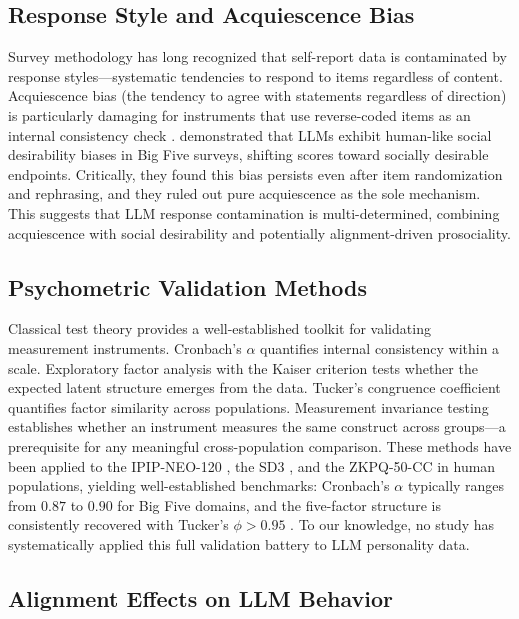 \documentclass[11pt]{article}
\begin{document}
\subsection{Response Style and Acquiescence Bias}

Survey methodology has long recognized that self-report data is contaminated by response styles---systematic tendencies to respond to items regardless of content. Acquiescence bias (the tendency to agree with statements regardless of direction) is particularly damaging for instruments that use reverse-coded items as an internal consistency check \citep{lord1968statistical}. \citet{acerbi2024llm} demonstrated that LLMs exhibit human-like social desirability biases in Big Five surveys, shifting scores toward socially desirable endpoints. Critically, they found this bias persists even after item randomization and rephrasing, and they ruled out pure acquiescence as the sole mechanism. This suggests that LLM response contamination is multi-determined, combining acquiescence with social desirability and potentially alignment-driven prosociality.

\subsection{Psychometric Validation Methods}

Classical test theory provides a well-established toolkit for validating measurement instruments. Cronbach's $\alpha$ \citep{cronbach1951coefficient} quantifies internal consistency within a scale. Exploratory factor analysis with the Kaiser criterion \citep{kaiser1960application} tests whether the expected latent structure emerges from the data. Tucker's congruence coefficient \citep{tucker1951method} quantifies factor similarity across populations. Measurement invariance testing establishes whether an instrument measures the same construct across groups---a prerequisite for any meaningful cross-population comparison. These methods have been applied to the IPIP-NEO-120 \citep{johnson2014measuring}, the SD3 \citep{jones2014introducing}, and the ZKPQ-50-CC \citep{zuckerman2002zuckerman} in human populations, yielding well-established benchmarks: Cronbach's $\alpha$ typically ranges from $0.87$ to $0.90$ for Big Five domains, and the five-factor structure is consistently recovered with Tucker's $\phi > 0.95$ \citep{mccrae2005universal}. To our knowledge, no study has systematically applied this full validation battery to LLM personality data.

\subsection{Alignment Effects on LLM Behavior}
\end{document}
